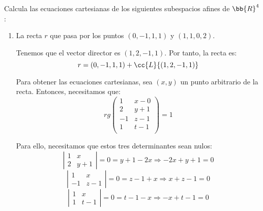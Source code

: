 \begin{ejercicio}
    Calcula las ecuaciones cartesianas de los siguientes subespacios afines de $\bb{R}^4$:
    \begin{enumerate}
        \item La recta $r$ que pasa por los puntos $(0, -1, 1, 1)$ y $(1, 1, 0, 2)$.

        Tenemos que el vector director es $(1, 2, -1, 1)$. Por tanto, la recta es:
        \begin{equation*}
            r = (0,-1,1,1) + \cc{L}\{(1,2,-1,1)\}
        \end{equation*}

        Para obtener las ecuaciones cartesianas, sea $(x,y)$ un punto arbitrario de la recta. Entonces, necesitamos que:
        \begin{equation*}
            rg\left(\begin{array}{cc}
                1 & x-0 \\
                2 & y +1 \\
                -1 & z- 1 \\
                1 & t-1 \\
            \end{array}\right) = 1
        \end{equation*}

        Para ello, necesitamos que estos tres determinantes sean nulos:
        \begin{equation*}
            \left|\begin{array}{cc}
                1 & x \\
                2 & y+1
            \end{array}\right| = 0 = y+1-2x \Longrightarrow -2x+y+1=0
        \end{equation*}
        \begin{equation*}
            \left|\begin{array}{cc}
                1 & x \\
                -1 & z-1
            \end{array}\right| = 0 = z-1+x \Longrightarrow x+z-1=0
        \end{equation*}
        \begin{equation*}
            \left|\begin{array}{cc}
                1 & x \\
                1 & t-1
            \end{array}\right| = 0 = t-1-x \Longrightarrow -x+t-1=0
        \end{equation*}


\end{enumerate}
\end{ejercicio}
